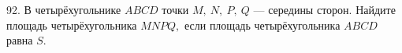 92. В четырёхугольнике $ABCD$ точки $M,\ N,\ P,\ Q$ --- середины сторон. Найдите площадь четырёхугольника $MNPQ,$ если площадь четырёхугольника $ABCD$ равна $S.$\\
